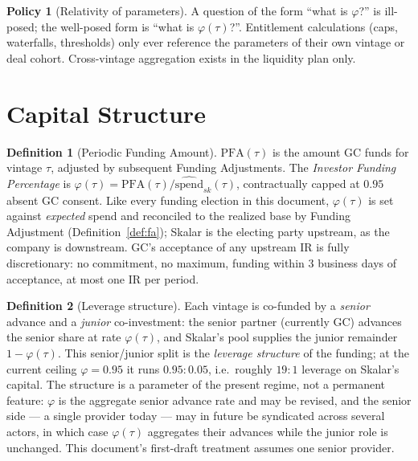 \documentclass[11pt, a4paper]{article}
\theoremstyle{definition}
\newtheorem{definition}{Definition}[section]
\newtheorem{policy}{Policy}
\newcommand{\src}[1]{}
\newcommand{\GCCIA}{upstream facility}
\newcommand{\PFA}{\mathrm{PFA}}                   %
\newcommand{\espend}{\widehat{\mathrm{spend}}}    %
\begin{document}
\begin{policy}[Relativity of parameters]\label{pol:relativity}
A question of the form ``what is $\varphi$?'' is ill-posed; the well-posed form is ``what is $\varphi(\tau)$?''. Entitlement calculations (caps, waterfalls, thresholds) only ever reference the parameters of their own vintage or deal cohort. Cross-vintage aggregation exists in the liquidity plan only.
\end{policy}

\section{Capital Structure}\label{sec:stack}

\begin{definition}[Periodic Funding Amount]\label{def:pfa}
$\PFA(\tau)$ is the amount GC funds for vintage $\tau$, adjusted by subsequent Funding Adjustments. The \emph{Investor Funding Percentage} is $\varphi(\tau) = \PFA(\tau) / \espend_{sk}(\tau)$, contractually capped at $0.95$ absent GC consent. Like every funding election in this document, $\varphi(\tau)$ is set against \emph{expected} spend and reconciled to the realized base by Funding Adjustment (Definition~\ref{def:fa}); Skalar is the electing party upstream, as the company is downstream. GC's acceptance of any upstream IR is fully discretionary: no commitment, no maximum, funding within 3 business days of acceptance, at most one IR per period.
\src{\GCCIA{} Sch.~A (``Periodic Funding Amount'', ``Investor Funding Percentage''); \GCCIA{} \S2.1(a)--(b).}
\end{definition}

\begin{definition}[Leverage structure]\label{def:leverage}
Each vintage is co-funded by a \emph{senior} advance and a \emph{junior} co-investment: the senior partner (currently GC) advances the senior share at rate $\varphi(\tau)$, and Skalar's pool supplies the junior remainder $1 - \varphi(\tau)$. This senior/junior split is the \emph{leverage structure} of the funding; at the current ceiling $\varphi = 0.95$ it runs $0.95 : 0.05$, i.e.\ roughly $19{:}1$ leverage on Skalar's capital. The structure is a parameter of the present regime, not a permanent feature: $\varphi$ is the aggregate senior advance rate and may be revised, and the senior side --- a single provider today --- may in future be syndicated across several actors, in which case $\varphi(\tau)$ aggregates their advances while the junior role is unchanged. This document's first-draft treatment assumes one senior provider.
\end{definition}
\end{document}
